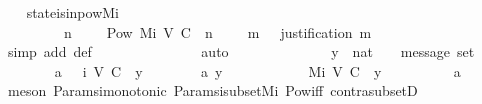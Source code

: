 \begin{isabellebody}
%
\isadelimproof
\isanewline
%
\endisadelimproof
\isanewline
\ \ \isamarkupfalse%
\ state{\isacharunderscore}is{\isacharunderscore}in{\isacharunderscore}pow{\isacharunderscore}M{\isacharunderscore}i\ {\isacharcolon}\isanewline
\ \ \ \ {\isachardoublequoteopen}{\isasymforall}\ {\isasymsigma}\ {\isasymin}\ {\isasymSigma}{\isachardot}\ {\isacharparenleft}{\isasymexists}\ n\ {\isasymin}\ {\isasymnat}{\isachardot}\ {\isasymsigma}\ {\isasymin}\ Pow\ {\isacharparenleft}M{\isacharunderscore}i\ {\isacharparenleft}V{\isacharcomma}\ C{\isacharcomma}\ {\isasymepsilon}{\isacharparenright}\ {\isacharparenleft}n\ {\isacharminus}\ {}{\isacharparenright}{\isacharparenright}\ {\isasymand}\ {\isacharparenleft}{\isasymforall}\ m\ {\isasymin}\ {\isasymsigma}{\isachardot}\ justification\ m\ {\isasymsubseteq}\ {\isasymsigma}{\isacharparenright}{\isacharparenright}{\isachardoublequoteclose}\ \isanewline
%
\isadelimproof
\ \ \ \ %
\endisadelimproof
%
\isatagproof
{}\isamarkupfalse%
\ {\isacharparenleft}simp\ add{\isacharcolon}\ {\isasymSigma}{\isacharunderscore}def{\isacharparenright}\isanewline
\ \ \ \ \isanewline
\ \ \ \ \isanewline
\ \ \ \ \isamarkupfalse%
\ auto\isanewline
\ \ \ \ \isamarkupfalse%
\ {\isacharminus}\isanewline
\ \ \ \ \ \ \isamarkupfalse%
\ y\ {\isacharcolon}{\isacharcolon}\ nat\ \ {\isasymsigma}\ {\isacharcolon}{\isacharcolon}\ {\isachardoublequoteopen}message\ set{\isachardoublequoteclose}\isanewline
\ \ \ \ \ \ \isamarkupfalse%
\ a{}{\isacharcolon}\ {\isachardoublequoteopen}{\isasymsigma}\ {\isasymin}\ {\isasymSigma}{\isacharunderscore}i\ {\isacharparenleft}V{\isacharcomma}\ C{\isacharcomma}\ {\isasymepsilon}{\isacharparenright}\ y{\isachardoublequoteclose}\isanewline
\ \ \ \ \ \ \isamarkupfalse%
\ a{}{\isacharcolon}\ {\isachardoublequoteopen}y\ {\isasymin}\ {\isasymnat}{\isachardoublequoteclose}\isanewline
\ \ \ \ \ \ \isamarkupfalse%
\ {\isachardoublequoteopen}{\isasymsigma}\ {\isasymsubseteq}\ M{\isacharunderscore}i\ {\isacharparenleft}V{\isacharcomma}\ C{\isacharcomma}\ {\isasymepsilon}{\isacharparenright}\ y{\isachardoublequoteclose}\isanewline
\ \ \ \ \ \ \ \ \isamarkupfalse%
\ a{}\ \isamarkupfalse%
\ {\isacharparenleft}meson\ Params{\isachardot}{\isasymSigma}i{\isacharunderscore}monotonic\ Params{\isachardot}{\isasymSigma}i{\isacharunderscore}subset{\isacharunderscore}Mi\ Pow{\isacharunderscore}iff\ contra{\isacharunderscore}subsetD{\isacharparenright}\isanewline

\end{isabellebody}
